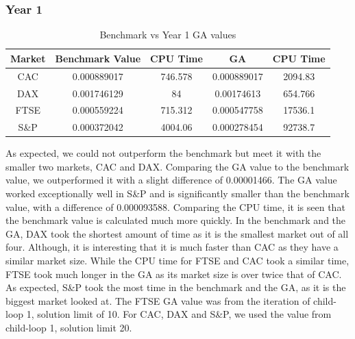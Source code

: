 \documentclass[12pt]{report}
\begin{document}
{\subsubsection*{Year 1}
\begin{table}[h!]
\centering
\begin{tabular}{| c | c | c | c |c|} 
\hline
\rowcolor{lightgray}
Market & Benchmark Value & CPU Time & GA & CPU Time\\
\hline
CAC    & 0.000889017 & 746.578 & 0.000889017 & 2094.83\\
\hline
DAX    & 0.001746129 & 84 & 0.00174613 & 654.766\\
\hline
FTSE   & 0.000559224 &  715.312 & 0.000547758 & 17536.1\\
\hline
S\&P   & 0.000372042 & 4004.06  & 0.000278454 & 92738.7\\
 \hline
\end{tabular}
\caption{Benchmark vs Year 1 GA values}
\label{table:benchyear1}
\end{table}
\noindent
As expected, we could not outperform the benchmark but meet it with the smaller two markets, CAC and DAX. Comparing the GA value to the benchmark value, we outperformed it with a slight difference of 0.00001466. The GA value worked exceptionally well in S\&P and is significantly smaller than the benchmark value, with a difference of 0.000093588. Comparing the CPU time, it is seen that the benchmark value is calculated much more quickly. In the benchmark and the GA, DAX took the shortest amount of time as it is the smallest market out of all four. Although, it is interesting that it is much faster than CAC as they have a similar market size. While the CPU time for FTSE and CAC took a similar time, FTSE took much longer in the GA as its market size is over twice that of CAC. As expected, S\&P took the most time in the benchmark and the GA, as it is the biggest market looked at.
The FTSE GA value was from the iteration of child-loop 1, solution limit of 10. For CAC, DAX and S\&P, we used the value from child-loop 1, solution limit 20. 
}
\end{document}

